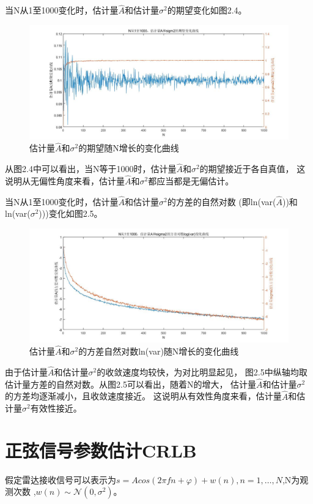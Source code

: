 \documentclass[fontset=windows]{article}
\numberwithin{figure}{section}
\begin{document}
当N从1至1000变化时，估计量\(\hat{A}\)和估计量\(\sigma^2\)的期望变化如图2.4。
\begin{figure}[H]
    \centering
    \includegraphics[scale=0.4]{fig2.4.jpg}
    \caption{估计量\(\hat{A}\)和\(\sigma^2\)的期望随N增长的变化曲线}
    \label{2.4}
\end{figure}
从图2.4中可以看出，当N等于1000时，估计量\(\hat{A}\)和\(\sigma^2\)的期望接近于各自真值，
这说明从无偏性角度来看，估计量\(\hat{A}\)和\(\sigma^2\)都应当都是无偏估计。

当N从1至1000变化时，估计量\(\hat{A}\)和估计量\(\sigma^2\)的方差的自然对数
(即ln(var(\(\hat{A}\)))和ln(var(\(\sigma^2\))))变化如图2.5。

\begin{figure}[H]
    \centering
    \includegraphics[scale=0.4]{fig2.5.jpg}
    \caption{估计量\(\hat{A}\)和\(\sigma^2\)的方差自然对数ln(var)随N增长的变化曲线}
    \label{2.5}
\end{figure}

由于估计量\(\hat{A}\)和估计量\(\sigma^2\)的收敛速度均较快，为对比明显起见，
图2.5中纵轴均取估计量方差的自然对数。从图2.5可以看出，随着N的增大，
估计量\(\hat{A}\)和估计量\(\sigma^2\)的方差均逐渐减小，且收敛速度接近。
这说明从有效性角度来看，估计量\(\hat{A}\)和估计量\(\sigma^2\)有效性接近。

\section{正弦信号参数估计CRLB}
假定雷达接收信号可以表示为\(s=Acos(2\pi fn+\varphi)+w(n),n=1,…,N\),N为观测次数
,\(w(n)\sim\mathcal{N}(0,\sigma^2)\)。
\end{document}
